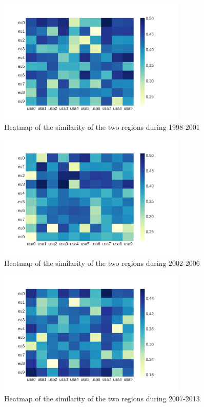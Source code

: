 \documentclass[12pt]{report}
\begin{document}
\begin{figure}
\centering
\includegraphics[width=0.8\textwidth]
{figs/heatmaps/heatmapFP5.png}
\caption{Heatmap of the similarity of the two regions during 1998-2001}
\label{heatmap5}
\end{figure}
\begin{figure}
\centering
\includegraphics[width=0.8\textwidth]
{figs/heatmaps/heatmapFP6.png}
\caption{Heatmap of the similarity of the two regions during 2002-2006}
\label{heatmap6}
\end{figure}
\begin{figure}
\centering
\includegraphics[width=0.8\textwidth]
{figs/heatmaps/heatmapFP7.png}
\caption{Heatmap of the similarity of the two regions during 2007-2013}
\label{heatmap7}
\end{figure}
\end{document}
